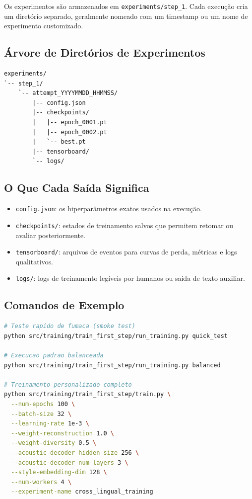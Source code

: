 \documentclass[11pt]{article}
\newcommand{\pathtt}[1]{\texttt{#1}}
\begin{document}
Os experimentos são armazenados em \pathtt{experiments/step\_1}. Cada execução cria um diretório separado, geralmente nomeado com um timestamp ou um nome de experimento customizado.

\subsection{Árvore de Diretórios de Experimentos}

\begin{lstlisting}
experiments/
`-- step_1/
    `-- attempt_YYYYMMDD_HHMMSS/
        |-- config.json
        |-- checkpoints/
        |   |-- epoch_0001.pt
        |   |-- epoch_0002.pt
        |   `-- best.pt
        |-- tensorboard/
        `-- logs/
\end{lstlisting}

\subsection{O Que Cada Saída Significa}

\begin{itemize}[leftmargin=1.5em]
  \item \pathtt{config.json}: os hiperparâmetros exatos usados na execução.
  \item \pathtt{checkpoints/}: estados de treinamento salvos que permitem retomar ou avaliar posteriormente.
  \item \pathtt{tensorboard/}: arquivos de eventos para curvas de perda, métricas e logs qualitativos.
  \item \pathtt{logs/}: logs de treinamento legíveis por humanos ou saída de texto auxiliar.
\end{itemize}

\subsection{Comandos de Exemplo}

\begin{lstlisting}[language=bash]
# Teste rapido de fumaca (smoke test)
python src/training/train_first_step/run_training.py quick_test

# Execucao padrao balanceada
python src/training/train_first_step/run_training.py balanced

# Treinamento personalizado completo
python src/training/train_first_step/train.py \
  --num-epochs 100 \
  --batch-size 32 \
  --learning-rate 1e-3 \
  --weight-reconstruction 1.0 \
  --weight-diversity 0.5 \
  --acoustic-decoder-hidden-size 256 \
  --acoustic-decoder-num-layers 3 \
  --style-embedding-dim 128 \
  --num-workers 4 \
  --experiment-name cross_lingual_training
\end{lstlisting}
\end{document}
